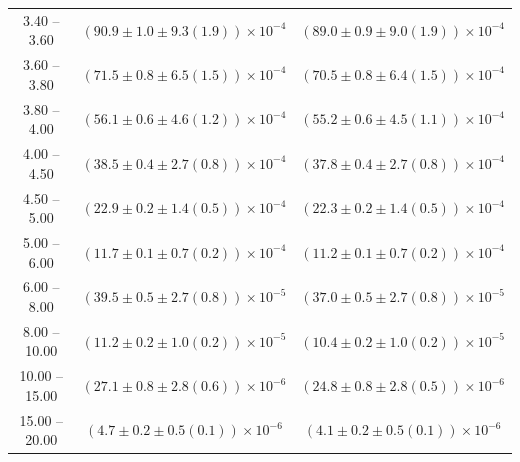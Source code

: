 \begin{table}
\begin{center}
\begin{tabular}{ c | c c }
3.40 -- 3.60 & $(90.9\pm1.0\pm9.3(1.9))\times10^{-4}$ & $(89.0\pm0.9\pm9.0(1.9))\times10^{-4}$ \\ 
3.60 -- 3.80 & $(71.5\pm0.8\pm6.5(1.5))\times10^{-4}$ & $(70.5\pm0.8\pm6.4(1.5))\times10^{-4}$ \\ 
3.80 -- 4.00 & $(56.1\pm0.6\pm4.6(1.2))\times10^{-4}$ & $(55.2\pm0.6\pm4.5(1.1))\times10^{-4}$ \\ 
4.00 -- 4.50 & $(38.5\pm0.4\pm2.7(0.8))\times10^{-4}$ & $(37.8\pm0.4\pm2.7(0.8))\times10^{-4}$ \\ 
4.50 -- 5.00 & $(22.9\pm0.2\pm1.4(0.5))\times10^{-4}$ & $(22.3\pm0.2\pm1.4(0.5))\times10^{-4}$ \\ 
5.00 -- 6.00 & $(11.7\pm0.1\pm0.7(0.2))\times10^{-4}$ & $(11.2\pm0.1\pm0.7(0.2))\times10^{-4}$ \\ 
6.00 -- 8.00 & $(39.5\pm0.5\pm2.7(0.8))\times10^{-5}$ & $(37.0\pm0.5\pm2.7(0.8))\times10^{-5}$ \\ 
8.00 -- 10.00 & $(11.2\pm0.2\pm1.0(0.2))\times10^{-5}$ & $(10.4\pm0.2\pm1.0(0.2))\times10^{-5}$ \\ 
10.00 -- 15.00 & $(27.1\pm0.8\pm2.8(0.6))\times10^{-6}$ & $(24.8\pm0.8\pm2.8(0.5))\times10^{-6}$ \\ 
15.00 -- 20.00 & $(4.7\pm0.2\pm0.5(0.1))\times10^{-6}$ & $(4.1\pm0.2\pm0.5(0.1))\times10^{-6}$ \\ 
\hline
\end{tabular}
\end{center}
\end{table}
 
